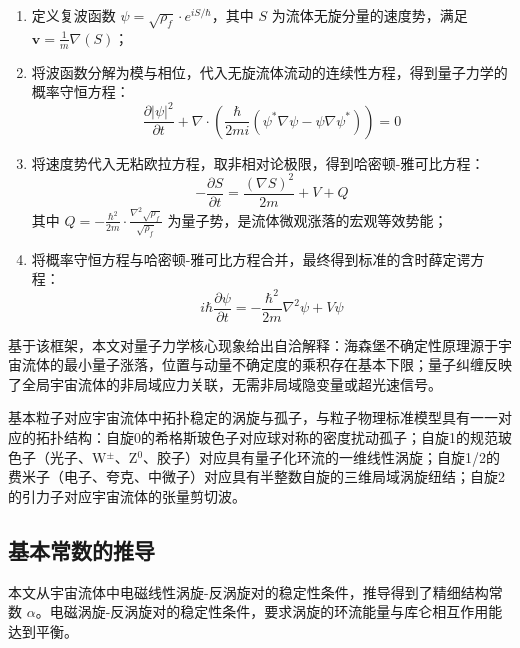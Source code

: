 \documentclass[aps,prd,preprint,superscriptaddress,floatfix]{revtex4-2}
\begin{document}
\begin{enumerate}
    \item 定义复波函数 $\psi=\sqrt{\rho_{f}} \cdot e^{i S / \hbar}$，其中 $S$ 为流体无旋分量的速度势，满足 $\boldsymbol{v}=\frac{1}{m} \nabla(S)$；
    \item 将波函数分解为模与相位，代入无旋流体流动的连续性方程，得到量子力学的概率守恒方程：
    \begin{equation}
    \frac{\partial|\psi|^{2}}{\partial t}+\nabla \cdot\left(\frac{\hbar}{2 m i}\left(\psi^{*} \nabla \psi-\psi \nabla \psi^{*}\right)\right)=0
    \label{eq:probability_conservation}
    \end{equation}
    \item 将速度势代入无粘欧拉方程，取非相对论极限，得到哈密顿-雅可比方程：
    \begin{equation}
    -\frac{\partial S}{\partial t}=\frac{(\nabla S)^{2}}{2 m}+V+Q
    \label{eq:hamilton_jacobi}
    \end{equation}
    其中 $Q=-\frac{\hbar^{2}}{2 m} \cdot \frac{\nabla^{2} \sqrt{\rho_{f}}}{\sqrt{\rho_{f}}}$ 为量子势，是流体微观涨落的宏观等效势能；
    \item 将概率守恒方程与哈密顿-雅可比方程合并，最终得到标准的含时薛定谔方程：
    \begin{equation}
    i \hbar \frac{\partial \psi}{\partial t}=-\frac{\hbar^{2}}{2 m} \nabla^{2} \psi+V \psi
    \label{eq:schrodinger}
    \end{equation}
\end{enumerate}

基于该框架，本文对量子力学核心现象给出自洽解释：海森堡不确定性原理源于宇宙流体的最小量子涨落，位置与动量不确定度的乘积存在基本下限；量子纠缠反映了全局宇宙流体的非局域应力关联，无需非局域隐变量或超光速信号。

基本粒子对应宇宙流体中拓扑稳定的涡旋与孤子，与粒子物理标准模型具有一一对应的拓扑结构：自旋0的希格斯玻色子对应球对称的密度扰动孤子；自旋1的规范玻色子（光子、W$^\pm$、Z$^0$、胶子）对应具有量子化环流的一维线性涡旋；自旋1/2的费米子（电子、夸克、中微子）对应具有半整数自旋的三维局域涡旋纽结；自旋2的引力子对应宇宙流体的张量剪切波。

\subsection{基本常数的推导}
本文从宇宙流体中电磁线性涡旋-反涡旋对的稳定性条件，推导得到了精细结构常数 $\alpha$。电磁涡旋-反涡旋对的稳定性条件，要求涡旋的环流能量与库仑相互作用能达到平衡。
\end{document}
